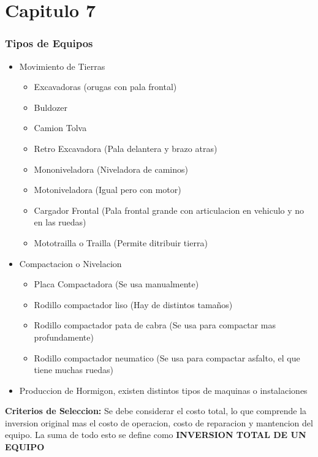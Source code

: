 \part{Capitulo 7}

\section{Tipos de Equipos}

\begin{itemize}
    \item Movimiento de Tierras
    \begin{itemize}
        \item Excavadoras (orugas con pala frontal)
        \item Buldozer
        \item Camion Tolva
        \item Retro Excavadora (Pala delantera y brazo atras)
        \item Mononiveladora (Niveladora de caminos)
        \item Motoniveladora (Igual pero con motor)
        \item Cargador Frontal (Pala frontal grande con articulacion en vehiculo y no en las ruedas)
        \item Mototrailla o Trailla (Permite ditribuir tierra)
    \end{itemize}
    \item Compactacion o Nivelacion
    \begin{itemize}
        \item Placa Compactadora (Se usa manualmente)
        \item Rodillo compactador liso (Hay de distintos tamaños)
        \item Rodillo compactador pata de cabra (Se usa para compactar mas profundamente)
        \item Rodillo compactador neumatico (Se usa para compactar asfalto, el que tiene muchas ruedas)
    \end{itemize}
    \item Produccion de Hormigon, existen distintos tipos de maquinas o instalaciones
\end{itemize}

\textbf{Criterios de Seleccion:} Se debe considerar el costo total, lo que comprende la inversion original mas el costo de operacion, costo de reparacion y mantencion del equipo. La suma de todo esto se define como \textbf{INVERSION TOTAL DE UN EQUIPO}


